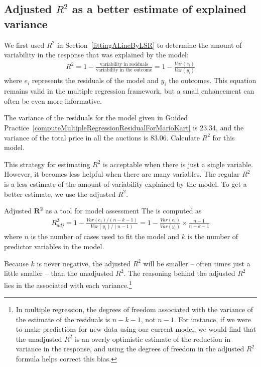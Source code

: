 \subsection{Adjusted $R^2$ as a better estimate of explained variance}


We first used $R^2$ in Section~\ref{fittingALineByLSR} to determine the amount of variability in the response that was explained by the model:
\begin{align*}
R^2 = 1 - \frac{\text{variability in residuals}}{\text{variability in the outcome}}
	= 1 - \frac{Var(e_i)}{Var(y_i)}
\end{align*}
where $e_i$ represents the residuals of the model and $y_i$ the outcomes. This equation remains valid in the multiple regression framework, but a small enhancement can often be even more informative.

\begin{exercisewrap}
\begin{nexercise} \label{computeUnadjustedR2ForAllPredictorsInMarioKart}
The variance of the residuals for the model given in Guided Practice~\ref{computeMultipleRegressionResidualForMarioKart} is 23.34, and the variance of the total price in all the auctions is 83.06. Calculate $R^2$ for this model.\footnotemark
\end{nexercise}
\end{exercisewrap}

This strategy for estimating $R^2$ is acceptable when there is just a single variable. However, it becomes less helpful when there are many variables. The regular $R^2$ is a less estimate of the amount of variability explained by the model. To get a better estimate, we use the adjusted $R^2$.

\begin{onebox}{Adjusted $\mathbf{R^2}$ as a tool for model assessment}
The  is computed as
\begin{align*}
R_{adj}^{2} = 1-\frac{Var(e_i) / (n-k-1)}{Var(y_i) / (n-1)}
	= 1-\frac{Var(e_i)}{Var(y_i)} \times \frac{n-1}{n-k-1}
\end{align*}
where $n$ is the number of cases used to fit the model and $k$ is the number of predictor variables in the model.
\end{onebox}

Because $k$ is never negative, the adjusted $R^2$ will be smaller -- often times just a little smaller -- than the unadjusted $R^2$. The reasoning behind the adjusted $R^2$ lies in the  associated with each variance.\footnote{In multiple regression, the degrees of freedom associated with the variance of the estimate of the residuals is $n-k-1$, not $n-1$. For instance, if we were to make predictions for new data using our current model, we would find that the unadjusted $R^2$ is an overly optimistic estimate of the reduction in variance in the response, and using the degrees of freedom in the adjusted $R^2$ formula helps correct this bias.}

